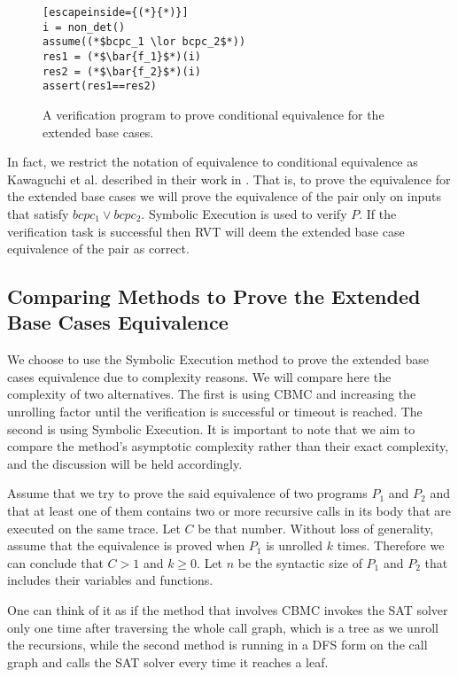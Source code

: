 \begin{figure} [h]
\begin{center}
\begin{minipage}{7 cm}
\begin{lstlisting}[escapeinside={(*}{*)}]
i = non_det()
assume((*$bcpc_1 \lor bcpc_2$*))
res1 = (*$\bar{f_1}$*)(i)
res2 = (*$\bar{f_2}$*)(i)
assert(res1==res2)
\end{lstlisting}
\end{minipage}
\caption{A verification program to prove conditional equivalence for the extended base cases.}
\label{fig:basegapvefprogram}
\end{center}
\end{figure}
In fact, we restrict the notation of equivalence to conditional equivalence as Kawaguchi et al. described in their work in \cite{kawaguchi2010conditional}. That is, to prove the equivalence for the extended base cases we will prove the equivalence of the pair only on inputs that satisfy $bcpc_1 \lor bcpc_2$. Symbolic Execution is used to verify $P$. If the verification task is successful then RVT will deem the extended base case equivalence of the pair as correct. 

\subsection{Comparing Methods to Prove the Extended Base Cases Equivalence}
We choose to use the Symbolic Execution method to prove the extended base cases equivalence due to complexity reasons. We will compare here the complexity of two alternatives. The first is using CBMC and increasing the unrolling factor until the verification is successful or timeout is reached. The second is using Symbolic Execution. It is important to note that we aim to compare the method's asymptotic complexity rather than their exact complexity, and the discussion will be held accordingly.  

Assume that we try to prove the said equivalence of two programs $P_1$ and $P_2$ and that at least one of them contains two or more recursive calls in its body that are executed on the same trace. Let $C$ be that number. Without loss of generality, assume that the equivalence is proved when $P_1$ is unrolled $k$ times. Therefore we can conclude that $C > 1$ and $k \geq 0$. Let $n$ be the syntactic size of $P_1$ and $P_2$ that includes their variables and functions. 

One can think of it as if the method that involves CBMC invokes the SAT solver only one time after traversing the whole call graph, which is a tree as we unroll the recursions, while the second method is running in a DFS form on the call graph and calls the SAT solver every time it reaches a leaf.

